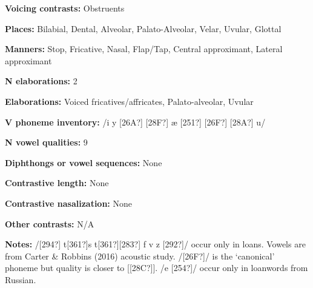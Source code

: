 \begin{styleBody}
\textbf{Voicing contrasts:} Obstruents
\end{styleBody}

\begin{styleBody}
\textbf{Places:} Bilabial, Dental, Alveolar, Palato-Alveolar, Velar, Uvular, Glottal
\end{styleBody}

\begin{styleBody}
\textbf{Manners:} Stop, Fricative, Nasal, Flap/Tap, Central approximant, Lateral approximant
\end{styleBody}

\begin{styleBody}
\textbf{N elaborations:} 2
\end{styleBody}

\begin{styleBody}
\textbf{Elaborations:} Voiced fricatives/affricates, Palato-alveolar, Uvular
\end{styleBody}

\begin{styleBody}
\textbf{V phoneme inventory:} /i y [26A?] [28F?] æ [251?] [26F?] [28A?] u/
\end{styleBody}

\begin{styleBody}
\textbf{N vowel qualities:} 9
\end{styleBody}

\begin{styleBody}
\textbf{Diphthongs or vowel sequences:} None
\end{styleBody}

\begin{styleBody}
\textbf{Contrastive length:} None
\end{styleBody}

\begin{styleBody}
\textbf{Contrastive nasalization:} None
\end{styleBody}

\begin{styleBody}
\textbf{Other contrasts:} N/A
\end{styleBody}

\begin{styleBody}
\textbf{Notes:} /[294?] t[361?]s t[361?][283?] f v z [292?]/ occur only in loans. Vowels are from Carter \& Robbins (2016) acoustic study. /[26F?]/ is the ‘canonical’ phoneme but quality is closer to [[28C?]]. /e [254?]/ occur only in loanwords from Russian.
\end{styleBody}

